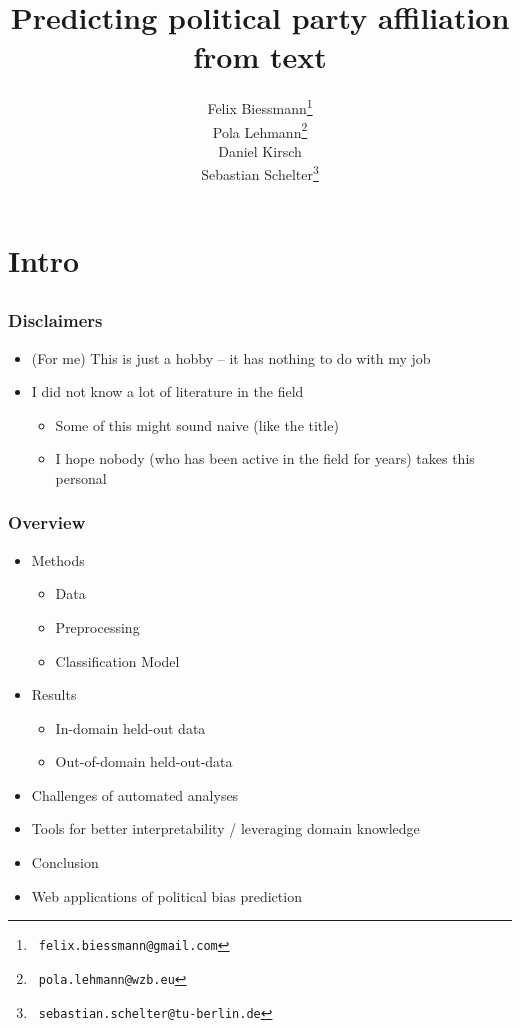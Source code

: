 \documentclass[]{beamer}
\institute[]{}
\title[]{
{
Predicting political party affiliation from text
}}
\author{
Felix Biessmann\thanks{~\tt felix.biessmann@gmail.com}\\
 Pola Lehmann\thanks{ ~{\tt pola.lehmann@wzb.eu} }\\
Daniel Kirsch\\
  Sebastian Schelter\thanks{~\tt sebastian.schelter@tu-berlin.de}\\
}
\begin{document}
\begin{frame} 
\titlepage 
\end{frame}	


\section{Intro}
\subsection{}

\begin{frame}\frametitle{Disclaimers}
\small
\begin{itemize}[<+->]
\item (For me) This is just a hobby -- it has nothing to do with my job
\item I did not know a lot of literature in the field 
\begin{itemize}
\item Some of this might sound naive (like the title)
\item I hope nobody (who has been active in the field for years) takes this personal
\end{itemize}
\end{itemize}
\end{frame}


\begin{frame}\frametitle{Overview}
\small
\begin{itemize}[<+->]
\item Methods 
\begin{itemize}
\item Data
\item Preprocessing
\item Classification Model
\end{itemize}
\item Results
\begin{itemize}
\item In-domain held-out data
\item Out-of-domain held-out-data
\end{itemize}
\item Challenges of automated analyses
\item Tools for better interpretability / leveraging domain knowledge
\item Conclusion
\item Web applications of political bias prediction
\end{itemize}
\end{frame}
\end{document}
